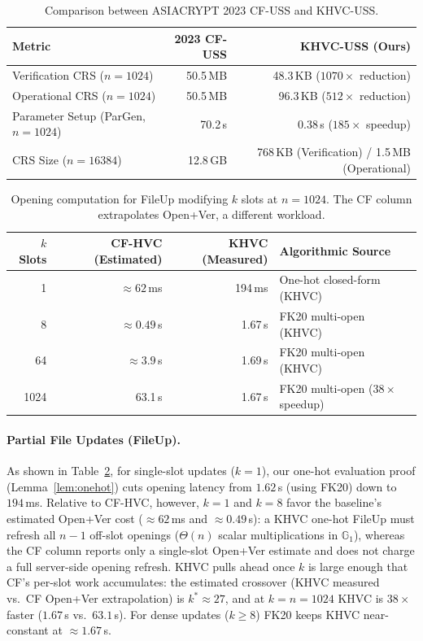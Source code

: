 \begin{table}[htbp]
\centering
\caption{Comparison between ASIACRYPT 2023 CF-USS and KHVC-USS.}
\label{tab:uss-cf}
\small
\begin{tabular}{@{}lrr@{}}
\toprule
Metric & 2023 CF-USS & KHVC-USS (Ours) \\
\midrule
Verification CRS ($n=1024$)   & 50.5\,MB & 48.3\,KB ($1070\times$ reduction) \\
Operational CRS ($n=1024$)    & 50.5\,MB & 96.3\,KB ($512\times$ reduction) \\
Parameter Setup (\textsf{ParGen}, $n=1024$) & 70.2\,s & 0.38\,s ($185\times$ speedup) \\
CRS Size ($n=16384$)          & 12.8\,GB & 768\,KB (Verification) / 1.5\,MB (Operational) \\
\bottomrule
\end{tabular}
\end{table}

\begin{table}[htbp]
\centering
\caption{Opening computation for \textsf{FileUp} modifying $k$ slots at $n=1024$. The CF column extrapolates Open+Ver, a different workload.}
\label{tab:fileup-k}
\small
\begin{tabular}{@{}rrrl@{}}
\toprule
$k$ Slots & CF-HVC (Estimated) & KHVC (Measured) & Algorithmic Source \\
\midrule
1   & $\approx 62$\,ms & 194\,ms & One-hot closed-form (KHVC) \\
8   & $\approx 0.49$\,s & 1.67\,s & FK20 multi-open (KHVC) \\
64  & $\approx 3.9$\,s  & 1.69\,s & FK20 multi-open (KHVC) \\
1024 & 63.1\,s          & 1.67\,s & FK20 multi-open ($38\times$ speedup) \\
\bottomrule
\end{tabular}
\end{table}

\paragraph{Partial File Updates (\textsf{FileUp}).}
As shown in Table~\ref{tab:fileup-k}, for single-slot updates ($k=1$), our one-hot evaluation proof (Lemma~\ref{lem:onehot}) cuts opening latency from $1.62$\,s (using FK20) down to $194$\,ms.
Relative to CF-HVC, however, $k=1$ and $k=8$ favor the baseline's estimated Open+Ver cost ($\approx 62$\,ms and $\approx 0.49$\,s): a KHVC one-hot FileUp must refresh all $n-1$ off-slot openings ($\Theta(n)$ scalar multiplications in $\mathbb{G}_1$), whereas the CF column reports only a single-slot Open+Ver estimate and does not charge a full server-side opening refresh.
KHVC pulls ahead once $k$ is large enough that CF's per-slot work accumulates: the estimated crossover (KHVC measured vs.\ CF Open+Ver extrapolation) is $k^*\approx 27$, and at $k=n=1024$ KHVC is $38\times$ faster ($1.67$\,s vs.\ $63.1$\,s).
For dense updates ($k\ge 8$) FK20 keeps KHVC near-constant at $\approx 1.67$\,s.

